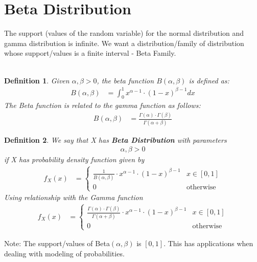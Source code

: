\documentclass[11pt,oneside]{book}
\theoremstyle{break}
\theoremstyle{break}
\newtheorem{defn}{Definition}[corL]
\newcommand{\note}{\color{Purple}Note: \color{black}}
\begin{document}
\section[Beta Distribution]{\color{DarkOrchid}Beta Distribution\color{black}}
The support (values of the random variable) for the normal distribution and gamma distribution is infinite. We want a distribution/family of distribution whose support/values is a finite interval - Beta Family.\\
\hfill\\
\begin{defn}
Given $\alpha,\beta>0$, the beta function $B(\alpha,\beta)$ is defined as:\begin{align*}
B(\alpha,\beta)&=\int_{0}^{1}x^{\alpha-1}\cdot (1-x)^{\beta-1}dx
\end{align*}
The Beta function is related to the gamma function as follows:\begin{align*}
B(\alpha,\beta)&=\frac{\Gamma(\alpha)\cdot \Gamma(\beta)}{\Gamma(\alpha+\beta)}
\end{align*}
\end{defn}
\begin{defn}
We say that X has \textbf{Beta Distribution} with parameters\begin{align*}
\alpha,\beta>0
\end{align*}
if X has probability density function given by \begin{align*}
f_X(x)&=\begin{cases}
\frac{1}{B(\alpha,\beta)}\cdot x^{\alpha-1}\cdot (1-x)^{\beta-1} &x\in [0,1]\\
0&\text{otherwise}
\end{cases}
\end{align*}
Using relationship with the Gamma function \begin{align*}
f_X(x)&=\begin{cases}
\frac{\Gamma(\alpha)\cdot \Gamma(\beta)}{\Gamma(\alpha+\beta)}\cdot x^{\alpha-1}\cdot (1-x)^{\beta-1} &x\in [0,1]\\
0&\text{otherwise}
\end{cases}
\end{align*}
\end{defn}
\note The support/values of Beta$(\alpha,\beta)$ is $[0,1]$. This has applications when dealing with modeling of probabilities.\\
\hfill\\
\end{document}
